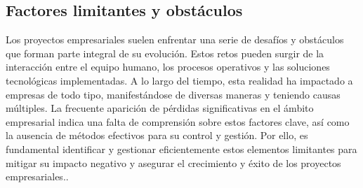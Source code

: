 \color{red}

\subsection{Factores limitantes y obstáculos}

Los proyectos empresariales suelen enfrentar una serie de desafíos y obstáculos que forman parte integral de su evolución. Estos retos pueden surgir de la interacción entre el equipo humano, los procesos operativos y las soluciones tecnológicas implementadas. A lo largo del tiempo, esta realidad ha impactado a empresas de todo tipo, manifestándose de diversas maneras y teniendo causas múltiples. La frecuente aparición de pérdidas significativas en el ámbito empresarial indica una falta de comprensión sobre estos factores clave, así como la ausencia de métodos efectivos para su control y gestión. Por ello, es fundamental identificar y gestionar eficientemente estos elementos limitantes para mitigar su impacto negativo y asegurar el crecimiento y éxito de los proyectos empresariales.\cite{AdministrarProyectos}.